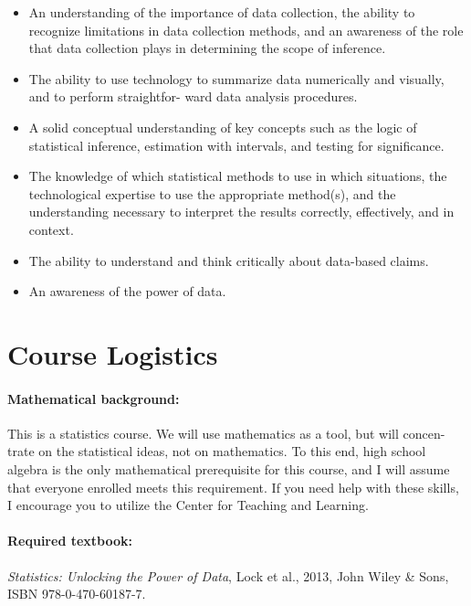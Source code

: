 \documentclass[11pt,]{article}
\providecommand{\tightlist}{%
  \setlength{\itemsep}{0pt}\setlength{\parskip}{0pt}}
\begin{document}
\begin{itemize}
\tightlist
\item
  An understanding of the importance of data collection, the ability to
  recognize limitations in data collection methods, and an awareness of
  the role that data collection plays in determining the scope of
  inference.
\item
  The ability to use technology to summarize data numerically and
  visually, and to perform straightfor- ward data analysis procedures.
\item
  A solid conceptual understanding of key concepts such as the logic of
  statistical inference, estimation with intervals, and testing for
  significance.
\item
  The knowledge of which statistical methods to use in which situations,
  the technological expertise to use the appropriate method(s), and the
  understanding necessary to interpret the results correctly,
  effectively, and in context.
\item
  The ability to understand and think critically about data-based
  claims.
\item
  An awareness of the power of data.
\end{itemize}

\section{Course Logistics}\label{course-logistics}

\paragraph{Mathematical background:}\label{mathematical-background}

This is a statistics course. We will use mathematics as a tool, but will
concen- trate on the statistical ideas, not on mathematics. To this end,
high school algebra is the only mathematical prerequisite for this
course, and I will assume that everyone enrolled meets this requirement.
If you need help with these skills, I encourage you to utilize the
Center for Teaching and Learning.

\paragraph{Required textbook:}\label{required-textbook}

\emph{Statistics: Unlocking the Power of Data}, Lock et al., 2013, John
Wiley \& Sons, ISBN 978-0-470-60187-7.
\end{document}
